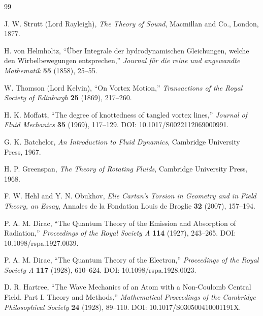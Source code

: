 \documentclass[11pt,a4paper]{article}
\begin{document}
    \begin{thebibliography}{99}
        
        J. W. Strutt (Lord Rayleigh),
        \textit{The Theory of Sound},
        Macmillan and Co., London, 1877.
        
        H. von Helmholtz,
        ``Über Integrale der hydrodynamischen Gleichungen, welche den Wirbelbewegungen entsprechen,''
        \textit{Journal für die reine und angewandte Mathematik} \textbf{55} (1858), 25--55.
        
        W. Thomson (Lord Kelvin),
        ``On Vortex Motion,''
        \textit{Transactions of the Royal Society of Edinburgh} \textbf{25} (1869), 217--260.
        
        H. K. Moffatt,
        ``The degree of knottedness of tangled vortex lines,''
        \textit{Journal of Fluid Mechanics} \textbf{35} (1969), 117--129.
        DOI: 10.1017/S0022112069000991.
        
        G. K. Batchelor,
        \textit{An Introduction to Fluid Dynamics},
        Cambridge University Press, 1967.
        
        H. P. Greenspan,
        \textit{The Theory of Rotating Fluids},
        Cambridge University Press, 1968.
        
        F. W. Hehl and Y. N. Obukhov,
        \textit{Elie Cartan's Torsion in Geometry and in Field Theory, an Essay},
        Annales de la Fondation Louis de Broglie \textbf{32} (2007), 157--194.
        
        P. A. M. Dirac,
        ``The Quantum Theory of the Emission and Absorption of Radiation,''
        \textit{Proceedings of the Royal Society A} \textbf{114} (1927), 243--265.
        DOI: 10.1098/rspa.1927.0039.
        
        P. A. M. Dirac,
        ``The Quantum Theory of the Electron,''
        \textit{Proceedings of the Royal Society A} \textbf{117} (1928), 610--624.
        DOI: 10.1098/rspa.1928.0023.
        
        D. R. Hartree,
        ``The Wave Mechanics of an Atom with a Non-Coulomb Central Field. Part I. Theory and Methods,''
        \textit{Mathematical Proceedings of the Cambridge Philosophical Society} \textbf{24} (1928), 89--110.
        DOI: 10.1017/S030500410001191X.
        

\end{thebibliography}
\end{document}

